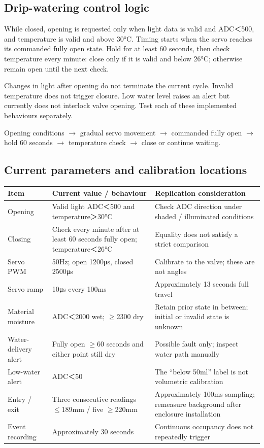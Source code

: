 \documentclass[10pt,a4paper]{article}
\begin{document}
\subsection{Drip-watering control logic}

While closed, opening is requested only when light data is valid and ADC＜500, and temperature is valid and above 30°C. Timing starts when the servo reaches its commanded fully open state. Hold for at least 60 seconds, then check temperature every minute: close only if it is valid and below 26°C; otherwise remain open until the next check.


Changes in light after opening do not terminate the current cycle. Invalid temperature does not trigger closure. Low water level raises an alert but currently does not interlock valve opening. Test each of these implemented behaviours separately.


Opening conditions $\rightarrow$ gradual servo movement $\rightarrow$ commanded fully open $\rightarrow$ hold 60 seconds $\rightarrow$ temperature check $\rightarrow$ close or continue waiting.




\subsection{Current parameters and calibration locations}

\begin{longtable}{>{\raggedright\arraybackslash}p{42mm}>{\raggedright\arraybackslash}p{59mm}>{\raggedright\arraybackslash}p{58mm}}
\toprule
\textbf{Item} & \textbf{Current value / behaviour} & \textbf{Replication consideration}\\\midrule\endhead
Opening & Valid light ADC＜500 and temperature＞30°C & Check ADC direction under shaded / illuminated conditions\\
Closing & Check every minute after at least 60 seconds fully open; temperature＜26°C & Equality does not satisfy a strict comparison\\
Servo PWM & 50Hz; open 1200μs, closed 2500μs & Calibrate to the valve; these are not angles\\
Servo ramp & 10μs every 100ms & Approximately 13 seconds full travel\\
Material moisture & ADC＜2000 wet; $\geq$2300 dry & Retain prior state in between; initial or invalid state is unknown\\
Water-delivery alert & Fully open $\geq$60 seconds and either point still dry & Possible fault only; inspect water path manually\\
Low-water alert & ADC＜50 & The “below 50ml” label is not volumetric calibration\\
Entry / exit & Three consecutive readings $\leq$189mm / five $\geq$220mm & Approximately 100ms sampling; remeasure background after enclosure installation\\
Event recording & Approximately 30 seconds & Continuous occupancy does not repeatedly trigger\\
\bottomrule\end{longtable}
\end{document}
